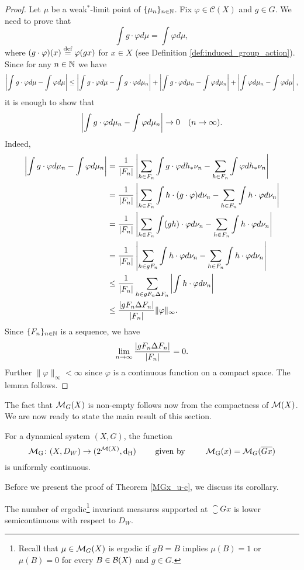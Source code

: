 \begin{proof}
Let $\mu$ be a weak$^*$-limit point of $\{\mu_n\}_{n\in\mathbb{N}}$. Fix $\varphi\in\mathcal C(X)$ and $g\in G$. We need to prove that 
\[
\int g\cdot \varphi d\mu = \int \varphi d\mu,
\]
where $(g\cdot\varphi)(x) \stackrel{\textup{def}}{=} \varphi(g x)$ for $x\in X$ (see Definition \ref{def:induced_group_action}).
Since for any $n\in\mathbb{N}$ we have
\[
\left|\int g\cdot \varphi d\mu - \int \varphi d\mu\right| \leq 
\left|\int g\cdot \varphi d\mu - \int g\cdot\varphi d\mu_n\right| +
\left|\int g\cdot \varphi d\mu_n - \int \varphi d\mu_n\right| +
\left|\int  \varphi d\mu_n - \int \varphi d\mu\right| ,
\]
it is enough to show that 
\[
\left|\int g\cdot \varphi d\mu_n - \int \varphi d\mu_n\right|\to 0 \quad (n\to\infty).
\]
Indeed,
\begin{align*}
\left|\int g\cdot \varphi d\mu_n - \int \varphi d\mu_n\right|&= 
\frac{1}{|F_n|}\left|\sum_{h\in F_n}\int g\cdot \varphi dh_*\nu_n - \sum_{h\in F_n}\int \varphi dh_*\nu_n\right| \\
&=\frac{1}{|F_n|}\left|\sum_{h\in F_n}\int h\cdot(g\cdot \varphi) d\nu_n - \sum_{h\in F_n}\int h\cdot \varphi d\nu_n\right|\\
&=\frac{1}{|F_n|}\left|\sum_{h\in F_n}\int (gh)\cdot \varphi d\nu_n - \sum_{h\in F_n}\int h\cdot \varphi d\nu_n\right|\\
&=\frac{1}{|F_n|}\left|\sum_{h\in gF_n}\int h\cdot \varphi d\nu_n - \sum_{h\in F_n}\int h\cdot \varphi d\nu_n\right|\\
&\leq\frac{1}{|F_n|}\sum_{h\in gF_n \Delta F_n}\left|\int h\cdot \varphi d\nu_n\right| \\
&\leq\frac{\left|gF_n\Delta F_n\right|}{|F_n|}\|\varphi\|_{\infty}. 
\end{align*}
Since $\{F_n\}_{n\in\mathbb{N}}$ is a \Folner sequence, we have
\[
\lim_{n\to\infty}\frac{\left|gF_n\Delta F_n\right|}{|F_n|}= 0.
\]
Further $\|\varphi\|_{\infty}<\infty$ since $\varphi$ is a continuous function on a compact space. The lemma follows.
\end{proof}
\noindent The fact that $\operatorname{\mathcal{M}}_G(X)$ is non-empty follows now from the compactness of $\operatorname{\mathcal{M}}(X)$.
%
We are now ready to state the main result of this section.

\begin{thm}\label{MGx_u-c}
For a dynamical system $(X,G)$, the function 
\[
\operatorname{\operatorname{\mathcal{M}}_G}\colon (X,D_W)\to (2^{\operatorname{\mathcal{M}}(X)},\operatorname{d_H}) ~~~~~~\text{ given by }~~~~~~ \operatorname{\operatorname{\mathcal{M}}_G}(x) = \operatorname{\mathcal{M}}_G(\overline{Gx})
\] 
is uniformly continuous.
\end{thm}

\noindent
Before we present the proof of Theorem \ref{MGx_u-c}, we discuss its corollary.
\begin{cor}
The number of ergodic\footnote{Recall that $\mu\in\operatorname{\mathcal{M}}_G(X)$ is ergodic if $gB=B$ implies $\mu(B)=1$ or $\mu(B)=0$ for every $B\in\mathcal{B}(X)$ and $g\in G$.} invariant measures supported at $\closure{Gx}$ is lower semicontinuous with respect to $D_W$.
\end{cor}

